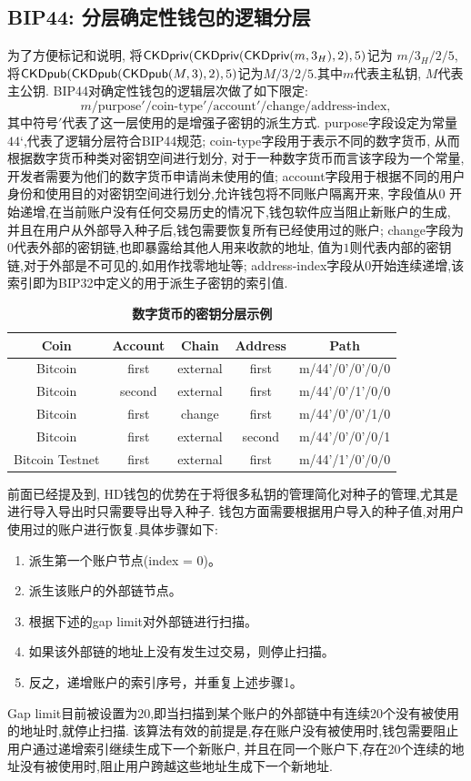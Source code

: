 \subsection{BIP44: 分层确定性钱包的逻辑分层}

为了方便标记和说明, 将$\textsf{CKDpriv} (\textsf{CKDpriv} (\textsf{CKDpriv} (m,3_H),2),5)$记为 $m/3_H/2/5$,
将$\textsf{CKDpub} (\textsf{CKDpub} (\textsf{CKDpub} (M,3),2),5)$记为$M/3/2/5$.其中$m$代表主私钥, $M$代表主公钥.
BIP44对确定性钱包的逻辑层次做了如下限定:
$$m / \text{purpose}' / \text{coin-type}' / \text{account}' / \text{change} / \text{address-index},$$
其中符号$'$代表了这一层使用的是增强子密钥的派生方式. 
purpose字段设定为常量$44‘$,代表了逻辑分层符合BIP44规范;
coin-type字段用于表示不同的数字货币, 从而根据数字货币种类对密钥空间进行划分,
对于一种数字货币而言该字段为一个常量,开发者需要为他们的数字货币申请尚未使用的值;
account字段用于根据不同的用户身份和使用目的对密钥空间进行划分,允许钱包将不同账户隔离开来,
字段值从0 开始递增,在当前账户没有任何交易历史的情况下,钱包软件应当阻止新账户的生成,
并且在用户从外部导入种子后,钱包需要恢复所有已经使用过的账户;
change字段为$0$代表外部的密钥链,也即暴露给其他人用来收款的地址,
值为$1$则代表内部的密钥链,对于外部是不可见的,如用作找零地址等;
address-index字段从0开始连续递增,该索引即为BIP32中定义的用于派生子密钥的索引值.

\begin{table}[h]
\centering
\caption{\textbf{数字货币的密钥分层示例}}
\begin{tabular}{|c|c|c|c|c|}
\hline
\small
Coin &  Account  &   Chain  &  Address &  Path \\\hline
Bitcoin &  first  &  external &  first &  m/44'/0'/0'/0/0 \\\hline
Bitcoin &  second  &  external &  first &  m/44'/0'/1'/0/0 \\\hline
Bitcoin &  first  &  change &  first &  m/44'/0'/0'/1/0 \\\hline
Bitcoin &  first  &  external &  second &  m/44'/0'/0'/0/1 \\\hline
Bitcoin Testnet &  first  &  external &  first &  m/44'/1'/0'/0/0\\\hline
\end{tabular}
\end{table}

前面已经提及到, HD钱包的优势在于将很多私钥的管理简化对种子的管理,尤其是进行导入导出时只需要导出导入种子.
钱包方面需要根据用户导入的种子值,对用户使用过的账户进行恢复.具体步骤如下:
\begin{enumerate}
\item 派生第一个账户节点(index = 0)。
\item 派生该账户的外部链节点。
\item 根据下述的gap limit对外部链进行扫描。
\item 如果该外部链的地址上没有发生过交易，则停止扫描。
\item 反之，递增账户的索引序号，并重复上述步骤1。
\end{enumerate}
Gap limit目前被设置为20,即当扫描到某个账户的外部链中有连续20个没有被使用的地址时,就停止扫描.
该算法有效的前提是,存在账户没有被使用时,钱包需要阻止用户通过递增索引继续生成下一个新账户,
并且在同一个账户下,存在20个连续的地址没有被使用时,阻止用户跨越这些地址生成下一个新地址.

